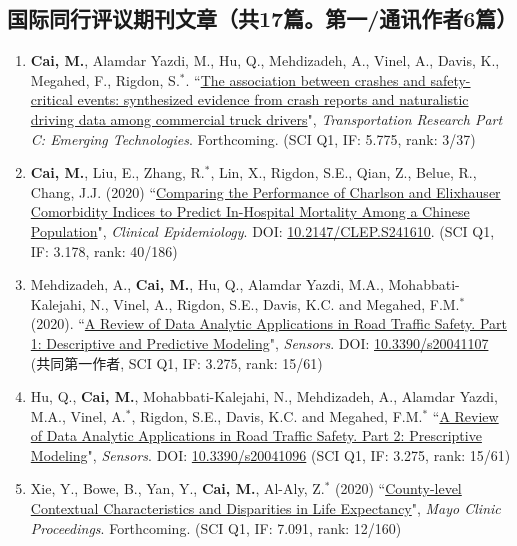 \documentclass[11pt, a4paper]{article}
\newcommand{\years}[1]{\marginnote{\scriptsize #1}}
\begin{document}
	\subsection*{国际同行评议期刊文章（共17篇。第一/通讯作者6篇）}
	\begin{enumerate}[leftmargin=0ex,itemsep=1ex]
		\item \years{2020}\textcolor{RubineRed}{\textbf{Cai, M.}}, Alamdar Yazdi, M., Hu, Q., Mehdizadeh, A., Vinel, A., Davis, K., Megahed, F., Rigdon, S.$^\ast$. ``\ul{The association between crashes and safety-critical events: synthesized evidence from crash reports and naturalistic driving data among commercial truck drivers}", \emph{Transportation Research Part C: Emerging Technologies}. Forthcoming. (SCI Q1, IF: 5.775, rank: 3/37)
		
		\item \textcolor{RubineRed}{\textbf{Cai, M.}}, Liu, E., Zhang, R.$^\ast$, Lin, X., Rigdon, S.E., Qian, Z., Belue, R., Chang, J.J. (2020) ``\ul{Comparing the Performance of Charlson and Elixhauser Comorbidity Indices to Predict In-Hospital Mortality Among a Chinese Population}", \emph{Clinical Epidemiology}. DOI: \href{https://doi.org/10.2147/CLEP.S241610}{10.2147/CLEP.S241610}. (SCI Q1, IF: 3.178, rank: 40/186)
		
		\item Mehdizadeh, A., \textcolor{RubineRed}{\textbf{Cai, M.}}, Hu, Q., Alamdar Yazdi, M.A., Mohabbati-Kalejahi, N., Vinel, A., Rigdon, S.E., Davis, K.C. and Megahed, F.M.$^\ast$ (2020). ``\ul{A Review of Data Analytic Applications in Road Traffic Safety. Part 1: Descriptive and Predictive Modeling}", \emph{Sensors}. DOI: \href{https://doi.org/10.3390/s20041107}{10.3390/s20041107} (共同第一作者, SCI Q1, IF: 3.275, rank: 15/61)
		
		\item Hu, Q., \textbf{Cai, M.}, Mohabbati-Kalejahi, N., Mehdizadeh, A., Alamdar Yazdi, M.A., Vinel, A.$^\ast$, Rigdon, S.E., Davis, K.C. and Megahed, F.M.$^\ast$ ``\ul{A Review of Data Analytic Applications in Road Traffic Safety. Part 2: Prescriptive Modeling}", \emph{Sensors}. DOI: \href{https://doi.org/10.3390/s20041096}{10.3390/s20041096} (SCI Q1, IF: 3.275, rank: 15/61)
		
		\item Xie, Y., Bowe, B., Yan, Y., \textbf{Cai, M.}, Al-Aly, Z.$^\ast$ (2020) ``\ul{County-level Contextual Characteristics and Disparities in Life Expectancy}", \emph{Mayo Clinic Proceedings}. Forthcoming. (SCI Q1, IF: 7.091, rank: 12/160)
		

\end{enumerate}
\end{document}
